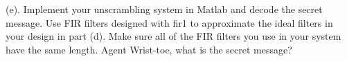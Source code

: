 (e). Implement your unscrambling system in Matlab and decode the secret message. Use FIR filters designed with fir1 to approximate the ideal filters in your design in part (d). Make sure all of the FIR filters you use in your system have the same length. Agent Wrist-toe, what is the secret message?
